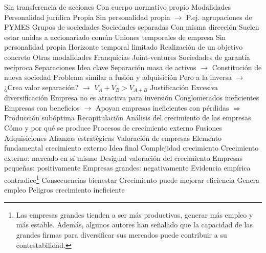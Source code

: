 \documentclass{nuevotema}
\begin{document}
\begin{esquemal}
				\4 Sin transferencia de acciones
				\4 Con cuerpo normativo propio
			\3 Modalidades
				\4 Personalidad jurídica
				\4[] Propia
				\4[] Sin personalidad propia
				\4[] $\to$ P.ej. agrupaciones de PYMES
				\4 Grupos de sociedades
				\4[] Sociedades separadas
				\4[] Con misma dirección
				\4[] Suelen estar unidas a accionariado común
				\4 Uniones temporales de empresa
				\4[] Sin personalidad propia
				\4[] Horizonte temporal limitado
				\4[] Realización de un objetivo concreto
				\4 Otras modalidades
				\4[] Franquicias
				\4[] Joint-ventures
				\4[] Sociedades de garantía recíproca
		\2 Separaciones
			\3 Idea clave
				\4 Separación masa de activos
				\4[] $\to$ Constitución de nueva sociedad
				\4 Problema similar a fusión y adquisición
				\4[] Pero a la inversa
				\4[] $\to$ ¿Crea valor separación?
				\4[] $\to$ $V_A + V_B > V_{A+B}$
			\3 Justificación
				\4 Excesiva diversificación
				\4[] Empresa no es atractiva para inversión
				\4 Conglomerados ineficientes
				\4[] Empresas con beneficios
				\4[] $\to$ Apoyan empresas ineficientes con pérdidas
				\4[] $\Rightarrow$ Producción subóptima
	\1[] 
		\2 Recapitulación
			\3 Análisis del crecimiento de las empresas
				\4 Cómo y por qué se produce
			\3 Procesos de crecimiento externo
				\4 Fusiones
				\4 Adquisiciones
				\4 Alianzas estratégicas
			\3 Valoración de empresas
				\4 Elemento fundamental crecimiento externo
		\2 Idea final
			\3 Complejidad crecimiento
				\4 Crecimiento externo: mercado en sí mismo
			\3 Desigual valoración del crecimiento
				\4 Empresas pequeñas: positivamente
				\4 Empresas grandes: negativamente
				\4 Evidencia empírica contradice\footnote{Las empresas grandes tienden a ser más productivas, generar más empleo y más estable. Además, algunos autores han señalado que la capacidad de las grandes firmas para diversificar sus mercados puede contribuir a su contestabilidad.}
			\3 Consecuencias bienestar
				\4 Crecimiento puede mejorar eficiencia
				\4 Genera empleo
				\4 Peligros crecimiento ineficiente
\end{esquemal}
\end{document}

